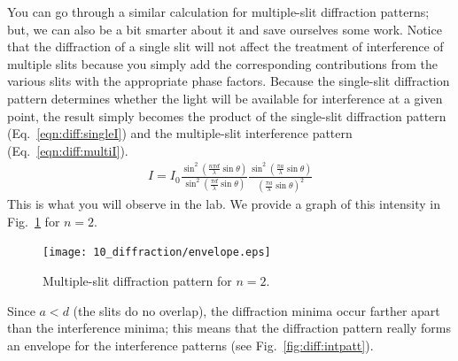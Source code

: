 You can go through a similar calculation for multiple-slit diffraction 
patterns; but, we can also be a bit smarter about it and save ourselves some 
work. Notice that the diffraction of a single slit will not affect the 
treatment of interference of multiple slits because you simply add the 
corresponding contributions from the various slits with the appropriate phase
factors. Because the single-slit diffraction pattern determines whether
the light will be available for interference at a given point, 
the result simply
becomes the product of the single-slit diffraction pattern 
(Eq.~\ref{eqn:diff:singleI}) and the multiple-slit 
interference pattern (Eq.~\ref{eqn:diff:multiI}). 
\begin{eqnarray}
I = I_0 \frac{\sin^2 \left(\frac{n\pi d}{\lambda} \sin \theta \right)}{
\sin^2 \left(\frac{\pi d}{\lambda} \sin \theta\right)}
        \frac{\sin^2 \left( \frac{\pi a}{\lambda} \sin \theta\right)}{
        \left( \frac{\pi a}{\lambda} \sin \theta  \right)^2}
    \label{eq:diff:multislit diffraction intensity}
\end{eqnarray}
This is what you will observe in the lab. We provide a graph of this intensity 
in Fig.~\ref{fig:diff:multislit diffraction} for $n=2$.
\begin{figure}
\centering 
\epsfysize=8cm \texttt{[image: 10\_diffraction/envelope.eps]}
\caption{Multiple-slit diffraction pattern for $n=2$.}
\label{fig:diff:multislit diffraction}
\end{figure}
Since $a < d$ (the slits do no overlap), 
the diffraction minima occur farther apart than the 
interference minima; this means that the diffraction pattern really forms an 
envelope for the interference patterns (see Fig.~\ref{fig:diff:intpatt}).
\newpage
